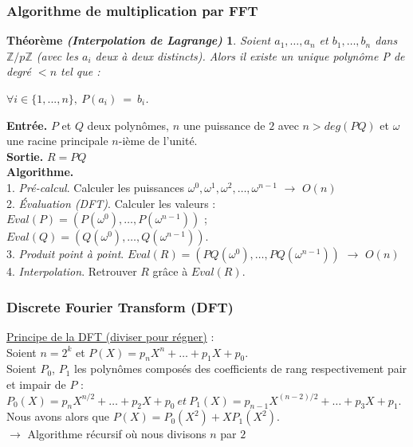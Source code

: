 \documentclass[8pt]{beamer}
\begin{document}
\begin{frame}
\frametitle{Algorithme de multiplication par FFT}
\newtheorem{Thm1}{Théorème \textit{(Interpolation de Lagrange)}}
\begin{Thm1}
Soient $a_1,\dots,a_n$ et $b_1,\dots,b_n$ dans $\mathbb{Z}/p\mathbb{Z}$  (avec les $a_i$ deux à deux distincts). Alors il existe un unique polynôme P de degré $< n$ tel que :
\begin{center}
$\forall i \in \{1,..., n\},\ P(a_i)\ =\ b_i$.
\end{center}
\end{Thm1}

\begin{tcolorbox}[colback=cyan!5!white,
                  colframe=cyan!100!black,
                  title=\textbf{Algorithme de multiplication par FFT}
                 ]
\textbf{Entrée.} $P$ et $Q$ deux polynômes, $n$ une puissance de $2$ avec $n>deg(PQ)$ et $\omega$ une racine principale $n$-ième de l’unité. \\[0.1cm]
\textbf{Sortie.} $R = PQ$ \\[0.1cm]
\textbf{Algorithme.} \\[0.1cm]
1. \textit{Pré-calcul}. Calculer les puissances $\omega^0,\omega^1,\omega^2,\dots,\omega^{n-1}$ $\to$ $O(n)$ \\[0.2cm]
2. \textit{Évaluation (DFT)}. Calculer les valeurs : \\[0.1cm] $Eval(P)=(P(\omega^0),\dots,P(\omega^{n-1}))$ ; $Eval(Q)=(Q(\omega^0),\dots,Q(\omega^{n-1}))$. \\[0.2cm]
3. \textit{Produit point à point}. $Eval(R) = (PQ(\omega^0),\dots,PQ(\omega^{n-1}))$ $\to$ $O(n)$ \\[0.2cm]
4. \textit{Interpolation}. Retrouver $R$ grâce à $Eval(R)$.
\end{tcolorbox}

\end{frame}

\begin{frame}
\frametitle{Discrete Fourier Transform (DFT)}

\underline{Principe de la DFT (diviser pour régner)} : \\[0.3cm]
Soient $n = 2^k$ et $P(X) = p_n X^n +\dots+p_1 X + p_0$. \\[0.2cm]
Soient $P_0$, $P_1$ les polynômes composés des coefficients de rang respectivement pair et impair de $P$ : \\
$P_0(X) = p_{n} X^{n/2} +\dots+ p_2 X + p_0\ et\ P_1(X) = p_{n-1} X^{(n-2)/2} +\dots+ p_3 X + p_1$. \\[0.2cm]
Nous avons alors que $P(X) = P_0(X^2)+X P_1(X^2)$. \\[0.1cm]
$\to$ Algorithme récursif où nous divisons $n$ par $2$

\end{frame}
\end{document}
